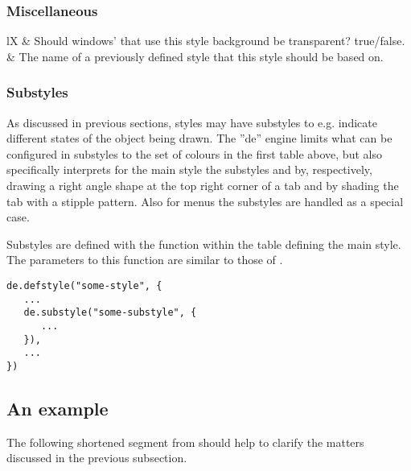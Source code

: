 \subsubsection{Miscellaneous}


\begin{tabularx}{\linewidth}{lX}
 & Should windows' that use this style
	background be transparent? true/false. \\
 & The name of a previously defined style that this
	style should be based on. \\
\end{tabularx}


\subsubsection{Substyles}

As discussed in previous sections, styles may have substyles to e.g.
indicate different states of the object being drawn. The ''de'' engine
limits what can be configured in substyles to the set of colours in the
first table above, but also specifically interprets for the main style
 the substyles  and 
by, respectively, drawing a right angle shape at the top right corner 
of a tab and by shading the tab with a stipple pattern. Also for
menus the substyles  are handled as a special case.

Substyles are defined with the function  within the
table defining the main style. The parameters to this function are 
similar to those of .

\begin{verbatim}
de.defstyle("some-style", {
   ...
   de.substyle("some-substyle", {
      ...
   }),
   ...
})
\end{verbatim}


\subsection{An example}

The following shortened segment from 
should help to clarify the matters discussed in the previous
subsection.

